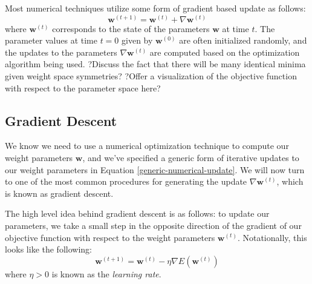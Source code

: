 
Most numerical techniques utilize some form of gradient based update as follows:
\begin{equation} \label{generic-numerical-update}
	\textbf{w}^{(t+1)} = \textbf{w}^{(t)} + \nabla \textbf{w}^{(t)}
\end{equation}
where $\textbf{w}^{(t)}$ corresponds to the state of the parameters $\textbf{w}$ at time $t$. The parameter values at time $t=0$ given by $\textbf{w}^{(0)}$ are often initialized randomly, and the updates to the parameters $\nabla\textbf{w}^{(t)}$ are computed based on the optimization algorithm being used. \newline
?Discuss the fact that there will be many identical minima given weight space symmetries? \newline
?Offer a visualization of the objective function with respect to the parameter space here?

\subsection{Gradient Descent}
We know we need to use a numerical optimization technique to compute our weight parameters $\textbf{w}$, and we've specified a generic form of iterative updates to our weight parameters in Equation \ref{generic-numerical-update}. We will now turn to one of the most common procedures for generating the update $\nabla\textbf{w}^{(t)}$, which is known as gradient descent.

The high level idea behind gradient descent is as follows: to update our parameters, we take a small step in the opposite direction of the gradient of our objective function with respect to the weight parameters $\textbf{w}^{(t)}$. Notationally, this looks like the following:
\begin{equation} \label{gradient-descent-equation}
	\textbf{w}^{(t+1)} = \textbf{w}^{(t)} - \eta \nabla E(\textbf{w}^{(t)})
\end{equation}
where $\eta > 0$ is known as the \textit{learning rate}.

